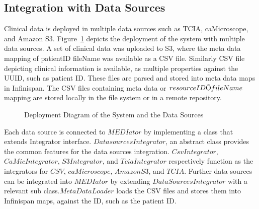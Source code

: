 \documentclass[conference]{IEEEtran}
\begin{document}
\subsection{Integration with Data Sources}
Clinical data is deployed in multiple data sources such as TCIA, caMicroscope, and Amazon S3. Figure~\ref{fig:dsdeployment} depicts the deployment of the system with multiple data sources. A set of clinical data was uploaded to S3, where the meta data mapping of patientID  fileName was available as a CSV file. Similarly CSV file depicting clinical information is available, as multiple properties against the UUID, such as patient ID. These files are parsed and stored into meta data maps in Infinispan. The CSV files containing meta data or $resource ID \ding{213} fileName$ mapping are stored locally in the file system or in a remote repository.
\begin{figure}[!htbp]
\begin{center}
\end{center}
 \vspace{-13pt}
 \caption{Deployment Diagram of the System and the Data Sources}
  \vspace{-13pt}
 \label{fig:dsdeployment}
\end{figure}

Each data source is connected to $MEDIator$ by implementing a class that extends Integrator interface. $DatasourcesIntegrator$, an abstract class provides the common features for the data sources integration. $CsvIntegrator$, $CaMicIntegrator$, $S3Integrator$, and $TciaIntegrator$ respectively function as the integrators for $CSV$, $caMicroscope$, $Amazon S3$, and $TCIA$. Further data sources can be integrated into $MEDIator$ by extending $DataSourcesIntegrator$ with a relevant sub class.$MetaDataLoader$ loads the CSV files and stores them into Infinispan maps, against the ID, such as the patient ID. 
\end{document}
